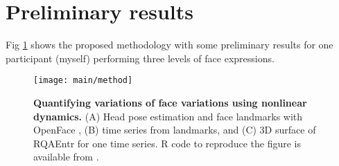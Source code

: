 \documentclass[12pt]{article}
\begin{document}
\section{Preliminary results}
Fig \ref{fig:method} shows the proposed methodology with 
some preliminary results for one participant (myself) performing 
three levels of face expressions. 


\begin{figure}
\centering
\texttt{[image: main/method]}
    \caption{
	{\bf Quantifying variations of face variations using nonlinear dynamics.}
	(A) Head pose estimation and face landmarks with OpenFace \cite{baltrusaitis2018},
	(B) time series from landmarks, and
	(C) 3D surface of RQAEntr for one time series.
	R code to reproduce the figure is available from \cite{xochicale2018repo}.
        }
\label{fig:method}
\end{figure}








\end{document}
